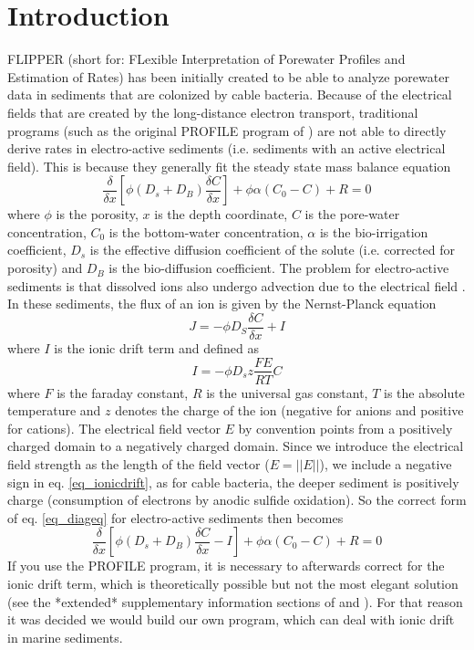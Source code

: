 \documentclass[10pt]{article}
\begin{document}
\section{Introduction}
FLIPPER (short for: FLexible Interpretation of Porewater Profiles and Estimation of Rates) has been initially created to be able to analyze porewater data in sediments that are colonized by cable bacteria. Because of the electrical fields that are created by the long-distance electron transport, traditional programs (such as the original PROFILE program of \cite{Berg1998}) are not able to directly derive rates in electro-active sediments (i.e. sediments with an active electrical field). This is because they generally fit the steady state mass balance equation
\begin{equation}
 \frac{\delta}{\delta x} \left[\phi\left(D_s+D_B \right) \frac{\delta C}{\delta x}\right] + \phi \alpha \left( C_0-C\right) +R= 0
 \label{eq_diageq}
\end{equation}
where $\phi$ is the porosity, $x$ is the depth coordinate, $C$ is the pore-water concentration, $C_0$ is the bottom-water concentration, $\alpha$ is the bio-irrigation coefficient, $D_s$ is the effective diffusion coefficient of the solute (i.e. corrected for porosity) and $D_B$ is the bio-diffusion coefficient. 
The problem for electro-active sediments is that dissolved ions also undergo advection due to the electrical field \cite{RisgaardPetersen2012}. In these sediments, the flux of an ion is given by the Nernst-Planck equation \cite{RisgaardPetersen2012}
\begin{equation}
 J = -\phi D_S\frac{\delta C}{\delta x} + I
 \label{eq_nernstplanck}
\end{equation}
where $I$ is the ionic drift term and defined as
\begin{equation}
I=-\phi D_s z \frac{FE}{RT}C
 \label{eq_ionicdrift}
\end{equation}
where $F$ is the faraday constant, $R$ is the universal gas constant, $T$ is the absolute temperature and $z$ denotes the charge of the ion (negative for anions and positive for cations). The electrical field vector $E$ by convention points from a positively charged domain to a negatively charged domain. Since we introduce the electrical field strength as the length of the field vector ($E=||E||$), we include a negative sign in eq. \ref{eq_ionicdrift}, as for cable bacteria, the deeper sediment is positively charge (consumption of electrons by anodic sulfide oxidation). So the correct form of eq. \ref{eq_diageq} for electro-active sediments then becomes
\begin{equation}
 \frac{\delta}{\delta x} \left[\phi\left(D_s+D_B \right) \frac{\delta C}{\delta x} - I \right] + \phi \alpha \left( C_0-C\right) +R= 0
 \label{eq_diagelectroactiveeq}
\end{equation}
If you use the PROFILE program, it is necessary to afterwards correct for the ionic drift term, which is theoretically possible but not the most elegant solution (see the *extended* supplementary information sections of \cite{vandeVelde2016} and \cite{vandeVelde2017}). For that reason it was decided we would build our own program, which can deal with ionic drift in marine sediments.
\end{document}
